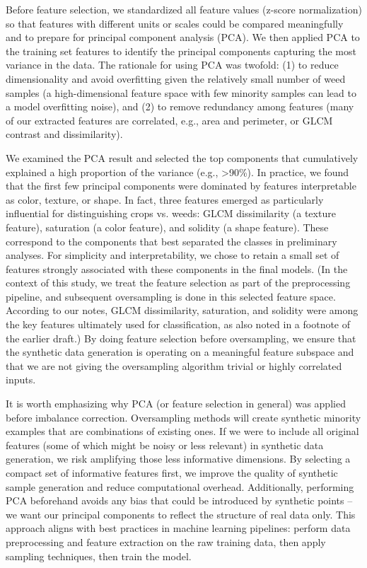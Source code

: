 \documentclass[agriengineering,article,submit,pdftex,moreauthors]{Definitions/mdpi}
\begin{document}
%
Before feature selection, we standardized all feature values (z-score normalization) so that features with different units or scales could be compared meaningfully and to prepare for principal component analysis (PCA). We then applied PCA to the training set features to identify the principal components capturing the most variance in the data. The rationale for using PCA was twofold: (1) to reduce dimensionality and avoid overfitting given the relatively small number of weed samples (a high-dimensional feature space with few minority samples can lead to a model overfitting noise), and (2) to remove redundancy among features (many of our extracted features are correlated, e.g., area and perimeter, or GLCM contrast and dissimilarity).
%

We examined the PCA result and selected the top components that cumulatively explained a high proportion of the variance (e.g., >90\%). In practice, we found that the first few principal components were dominated by features interpretable as color, texture, or shape. In fact, three features emerged as particularly influential for distinguishing crops vs. weeds: GLCM dissimilarity (a texture feature), saturation (a color feature), and solidity (a shape feature). These correspond to the components that best separated the classes in preliminary analyses. For simplicity and interpretability, we chose to retain a small set of features strongly associated with these components in the final models. (In the context of this study, we treat the feature selection as part of the preprocessing pipeline, and subsequent oversampling is done in this selected feature space. According to our notes, GLCM dissimilarity, saturation, and solidity were among the key features ultimately used for classification, as also noted in a footnote of the earlier draft.) By doing feature selection before oversampling, we ensure that the synthetic data generation is operating on a meaningful feature subspace and that we are not giving the oversampling algorithm trivial or highly correlated inputs.
%

It is worth emphasizing why PCA (or feature selection in general) was applied before imbalance correction. Oversampling methods will create synthetic minority examples that are combinations of existing ones. If we were to include all original features (some of which might be noisy or less relevant) in synthetic data generation, we risk amplifying those less informative dimensions. By selecting a compact set of informative features first, we improve the quality of synthetic sample generation and reduce computational overhead. Additionally, performing PCA beforehand avoids any bias that could be introduced by synthetic points – we want our principal components to reflect the structure of real data only. This approach aligns with best practices in machine learning pipelines: perform data preprocessing and feature extraction on the raw training data, then apply sampling techniques, then train the model.
% 
\end{document}
